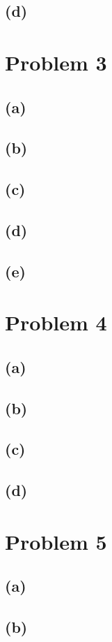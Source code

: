 \documentclass{article}
\begin{document}
\subsection{(d)}

\section{Problem 3}
\subsection{(a)}
\subsection{(b)}
\subsection{(c)}
\subsection{(d)}
\subsection{(e)}

\section{Problem 4}
\subsection{(a)}
\subsection{(b)}
\subsection{(c)}
\subsection{(d)}

\section{Problem 5}
\subsection{(a)}
\subsection{(b)}
\end{document}

